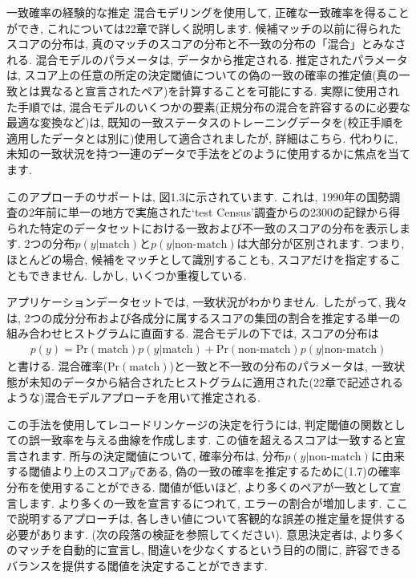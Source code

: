\documentclass[10pt,dvipdfmx,a4]{beamer}
\newcommand{\eq}[1]{\begin{align}#1\end{align}}
\begin{document}

\begin{frame}{一致確率の経験的な推定}
混合モデリングを使用して, 正確な一致確率を得ることができ, これについては22章で詳しく説明します.
候補マッチの以前に得られたスコアの分布は, 真のマッチのスコアの分布と不一致の分布の「混合」とみなされる.
混合モデルのパラメータは, データから推定される.
推定されたパラメータは, スコア上の任意の所定の決定閾値についての偽の一致の確率の推定値(真の一致とは異なると宣言されたペア)を計算することを可能にする.
実際に使用された手順では, 混合モデルのいくつかの要素(正規分布の混合を許容するのに必要な最適な変換など)は, 既知の一致ステータスのトレーニングデータを(校正手順を適用したデータとは別に)使用して適合されましたが, 詳細はこちら.
代わりに, 未知の一致状況を持つ一連のデータで手法をどのように使用するかに焦点を当てます.

このアプローチのサポートは, 図1.3に示されています.
これは, 1990年の国勢調査の2年前に単一の地方で実施された`test Census'調査からの2300の記録から得られた特定のデータセットにおける一致および不一致のスコアの分布を表示します.
2つの分布$p(y|\text{match})$と$p(y|\text{non-match})$は大部分が区別されます.
つまり, ほとんどの場合, 候補をマッチとして識別することも, スコアだけを指定することもできません.
しかし, いくつか重複している.
\end{frame}


\begin{frame}
アプリケーションデータセットでは, 一致状況がわかりません.
したがって, 我々は, 2つの成分分布および各成分に属するスコアの集団の割合を推定する単一の組み合わせヒストグラムに直面する.
混合モデルの下では, スコアの分布は
\eq{p(y)=\text{Pr}(\text{match})p(y|\text{match})+\text{Pr}(\text{non-match})p(y|\text{non-match})}
と書ける.
混合確率($\text{Pr}(\text{match})$)と一致と不一致の分布のパラメータは, 一致状態が未知のデータから結合されたヒストグラムに適用された(22章で記述されるような)混合モデルアプローチを用いて推定される.

この手法を使用してレコードリンケージの決定を行うには, 判定閾値の関数としての誤一致率を与える曲線を作成します.
この値を超えるスコアは一致すると宣言されます.
所与の決定閾値について, 確率分布は, 分布$p(y|\text{non-match})$に由来する閾値より上のスコア$y$である, 偽の一致の確率を推定するために(1.7)の確率分布を使用することができる.
閾値が低いほど, より多くのペアが一致として宣言します.
より多くの一致を宣言するにつれて, エラーの割合が増加します.
ここで説明するアプローチは, 各しきい値について客観的な誤差の推定量を提供する必要があります.
(次の段落の検証を参照してください).
意思決定者は, より多くのマッチを自動的に宣言し, 間違いを少なくするという目的の間に, 許容できるバランスを提供する閾値を決定することができます.
\end{frame}
\end{document}
